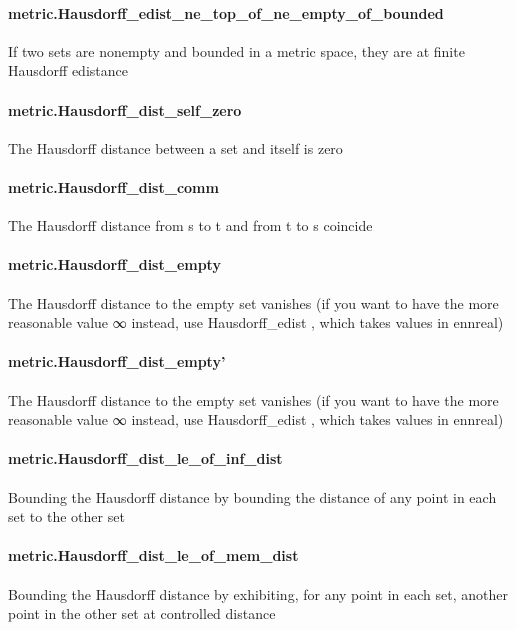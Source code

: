 \documentclass{article}
\begin{document}
\paragraph{metric.Hausdorff\_edist\_ne\_top\_of\_ne\_empty\_of\_bounded}
\par
If two sets are nonempty and bounded in a metric space, they are at finite Hausdorff edistance
\paragraph{metric.Hausdorff\_dist\_self\_zero}
\par
The Hausdorff distance between a set and itself is zero
\paragraph{metric.Hausdorff\_dist\_comm}
\par
The Hausdorff distance from 
\colorbox[RGB]{253,246,227}{{{{\color[RGB]{101, 123, 131} s }}}} to 
\colorbox[RGB]{253,246,227}{{{{\color[RGB]{101, 123, 131} t }}}} and from 
\colorbox[RGB]{253,246,227}{{{{\color[RGB]{101, 123, 131} t }}}} to 
\colorbox[RGB]{253,246,227}{{{{\color[RGB]{101, 123, 131} s }}}} coincide
\paragraph{metric.Hausdorff\_dist\_empty}
\par
The Hausdorff distance to the empty set vanishes (if you want to have the more reasonable
value ∞ instead, use 
\colorbox[RGB]{253,246,227}{{{{\color[RGB]{101, 123, 131} Hausdorff\_edist }}}}, which takes values in ennreal)
\paragraph{metric.Hausdorff\_dist\_empty'}
\par
The Hausdorff distance to the empty set vanishes (if you want to have the more reasonable
value ∞ instead, use 
\colorbox[RGB]{253,246,227}{{{{\color[RGB]{101, 123, 131} Hausdorff\_edist }}}}, which takes values in ennreal)
\paragraph{metric.Hausdorff\_dist\_le\_of\_inf\_dist}
\par
Bounding the Hausdorff distance by bounding the distance of any point
in each set to the other set
\paragraph{metric.Hausdorff\_dist\_le\_of\_mem\_dist}
\par
Bounding the Hausdorff distance by exhibiting, for any point in each set,
another point in the other set at controlled distance
\end{document}
